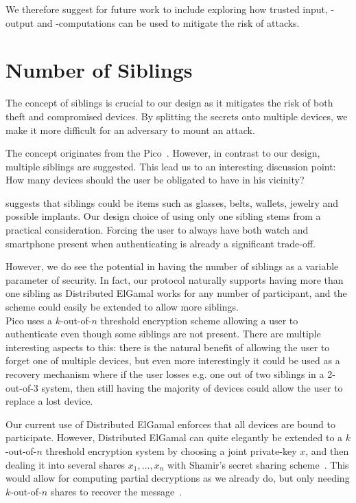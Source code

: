 We therefore suggest for future work to include exploring how trusted input, -output and -computations can be used to mitigate the risk of attacks.

\section{Number of Siblings}

The concept of siblings is crucial to our design as it mitigates the risk of both theft and compromised devices. By splitting the secrets onto multiple devices, we make it more difficult for an adversary to mount an attack. 

The concept originates from the Pico~\cite{stajano2011pico, stannard2012good}. However, in contrast to our design, multiple siblings are suggested. This lead us to an interesting discussion point: How many devices should the user be obligated to have in his vicinity?

\citet{stajano2011pico} suggests that siblings could be items such as glasses, belts, wallets, jewelry and possible implants. Our design choice of using only one sibling stems from a practical consideration. Forcing the user to always have both watch and smartphone present when authenticating is already a significant trade-off.

However, we do see the potential in having the number of siblings as a variable parameter of security. In fact, our protocol naturally supports having more than one sibling as Distributed ElGamal works for any number of participant, and the scheme could easily be extended to allow more siblings.\\

Pico uses a $k$-out-of-$n$ threshold encryption scheme allowing a user to authenticate even though some siblings are not present. There are multiple interesting aspects to this: there is the natural benefit of allowing the user to forget one of multiple devices, but even more interestingly it could be used as a recovery mechanism where if the user losses e.g. one out of two siblings in a 2-out-of-3 system, then still having the majority of devices could allow the user to replace a lost device.

Our current use of Distributed ElGamal enforces that all devices are bound to participate. However, Distributed ElGamal can quite elegantly be extended to a $k$-out-of-$n$ threshold encryption system by choosing a joint private-key $x$, and then dealing it into several shares $x_1, ..., x_n$ with Shamir's secret sharing scheme~\cite{shamir1979share}. This would allow for computing partial decryptions as we already do, but only needing $k$-out-of-$n$ shares to recover the message~\cite[page 506]{katz2014introduction}.

